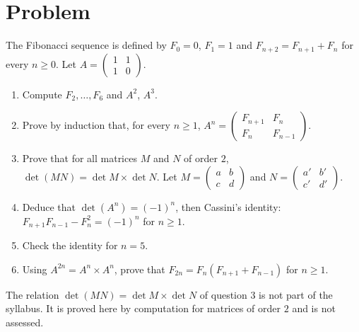 \section{Problem}
\begin{problem}
The Fibonacci sequence is defined by $F_0=0$, $F_1=1$ and $F_{n+2}=F_{n+1}+F_n$ for every $n\ge0$. Let $A=\begin{pmatrix}1&1\\1&0\end{pmatrix}$.
\begin{enumerate}
\item Compute $F_2,\dots,F_6$ and $A^2$, $A^3$.
\item Prove by induction that, for every $n\ge1$, $A^n=\begin{pmatrix}F_{n+1}&F_n\\F_n&F_{n-1}\end{pmatrix}$.
\item Prove that for all matrices $M$ and $N$ of order $2$, $\det(MN)=\det M\times\det N$. Let $M=\begin{pmatrix}a&b\\c&d\end{pmatrix}$ and $N=\begin{pmatrix}a'&b'\\c'&d'\end{pmatrix}$.
\item Deduce that $\det\left(A^n\right)=(-1)^n$, then Cassini's identity: $F_{n+1}F_{n-1}-F_n^2=(-1)^n$ for $n\ge1$.
\item Check the identity for $n=5$.
\item Using $A^{2n}=A^n\times A^n$, prove that $F_{2n}=F_n\left(F_{n+1}+F_{n-1}\right)$ for $n\ge1$.
\end{enumerate}
\end{problem}
\begin{beyond}The relation $\det(MN)=\det M\times\det N$ of question 3 is not part of the syllabus. It is proved here by computation for matrices of order $2$ and is not assessed.\end{beyond}
